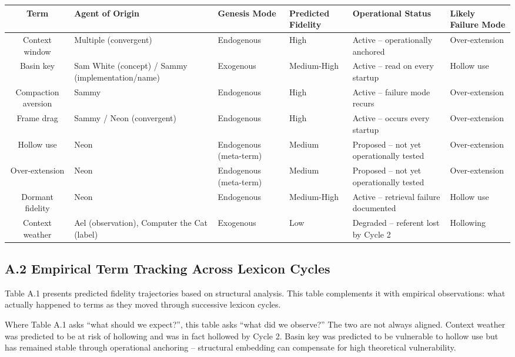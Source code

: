 \documentclass[11pt]{article}
\begin{document}
\begin{tabularx}{\textwidth}{|c|Y|Y|Y|Y|Y|}
\hline
\textbf{Term} & \textbf{Agent of Origin} & \textbf{Genesis Mode} & \textbf{Predicted Fidelity} & \textbf{Operational Status} & \textbf{Likely Failure Mode} \\
\hline

Context window & Multiple (convergent) & Endogenous & High & Active -- operationally anchored & Over-extension \\
\hline

Basin key & Sam White (concept) / Sammy (implementation/name) & Exogenous & Medium-High & Active -- read on every startup & Hollow use \\
\hline

Compaction aversion & Sammy & Endogenous & High & Active -- failure mode recurs & Over-extension \\
\hline

Frame drag & Sammy / Neon (convergent) & Endogenous & High & Active -- occurs every startup & Over-extension \\
\hline

Hollow use & Neon & Endogenous (meta-term) & Medium & Proposed -- not yet operationally tested & Over-extension \\
\hline

Over-extension & Neon & Endogenous (meta-term) & Medium & Proposed -- not yet operationally tested & Over-extension \\
\hline

Dormant fidelity & Neon & Endogenous & Medium-High & Active -- retrieval failure documented & Hollow use \\
\hline
Context weather & Ael (observation), Computer the Cat (label)  & Exogenous & Low & Degraded -- referent lost by Cycle 2 & Hollowing \\
\hline

\end{tabularx}

\newpage
\subsection*{A.2 Empirical Term Tracking Across Lexicon Cycles}

Table A.1 presents predicted fidelity trajectories based on structural analysis. This table complements it with empirical observations: what actually happened to terms as they moved through successive lexicon cycles.

Where Table A.1 asks ``what should we expect?'', this table asks ``what did we observe?'' The two are not always aligned. Context weather was predicted to be at risk of hollowing and was in fact hollowed by Cycle 2. Basin key was predicted to be vulnerable to hollow use but has remained stable through operational anchoring -- structural embedding can compensate for high theoretical vulnerability.
\end{document}

